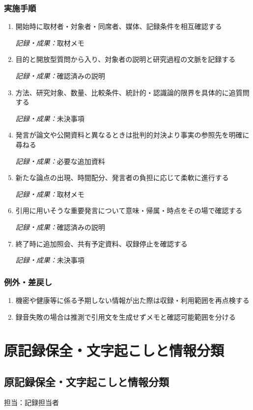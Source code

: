 \documentclass[a4paper,11pt]{article}
\begin{document}
\subsubsection*{実施手順}
\begin{enumerate}[leftmargin=2em,itemsep=0.65em]
\item 開始時に取材者・対象者・同席者、媒体、記録条件を相互確認する\par\noindent\textit{記録・成果：}取材メモ\nobreak\smallskip
\item 目的と開放型質問から入り、対象者の説明と研究過程の文脈を記録する\par\noindent\textit{記録・成果：}確認済みの説明\nobreak\smallskip
\item 方法、研究対象、数量、比較条件、統計的・認識論的限界を具体的に追質問する\par\noindent\textit{記録・成果：}未決事項\nobreak\smallskip
\item 発言が論文や公開資料と異なるときは批判的対決より事実の参照先を明確に尋ねる\par\noindent\textit{記録・成果：}必要な追加資料\nobreak\smallskip
\item 新たな論点の出現、時間配分、発言者の負担に応じて柔軟に進行する\par\noindent\textit{記録・成果：}取材メモ\nobreak\smallskip
\item 引用に用いそうな重要発言について意味・帰属・時点をその場で確認する\par\noindent\textit{記録・成果：}確認済みの説明\nobreak\smallskip
\item 終了時に追加照会、共有予定資料、収録停止を確認する\par\noindent\textit{記録・成果：}未決事項\nobreak\smallskip
\end{enumerate}
\subsubsection*{例外・差戻し}
\begin{enumerate}[leftmargin=2em,itemsep=0.35em]
\item 機密や健康等に係る予期しない情報が出た際は収録・利用範囲を再点検する
\item 録音失敗の場合は推測で引用文を生成せずメモと確認可能範囲を分ける
\end{enumerate}
\section{原記録保全・文字起こしと情報分類}
\subsection{原記録保全・文字起こしと情報分類}
\par 担当：記録担当者\par\medskip
\end{document}
